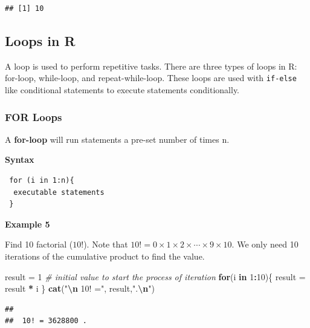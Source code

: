 \documentclass[
]{book}
\newenvironment{Shaded}{\begin{snugshade}}{\end{snugshade}}
\newcommand{\CommentTok}[1]{\textcolor[rgb]{0.56,0.35,0.01}{\textit{#1}}}
\newcommand{\ControlFlowTok}[1]{\textcolor[rgb]{0.13,0.29,0.53}{\textbf{#1}}}
\newcommand{\DecValTok}[1]{\textcolor[rgb]{0.00,0.00,0.81}{#1}}
\newcommand{\FunctionTok}[1]{\textcolor[rgb]{0.13,0.29,0.53}{\textbf{#1}}}
\newcommand{\NormalTok}[1]{#1}
\newcommand{\OtherTok}[1]{\textcolor[rgb]{0.56,0.35,0.01}{#1}}
\newcommand{\SpecialCharTok}[1]{\textcolor[rgb]{0.81,0.36,0.00}{\textbf{#1}}}
\newcommand{\StringTok}[1]{\textcolor[rgb]{0.31,0.60,0.02}{#1}}
\begin{document}
\begin{verbatim}
## [1] 10
\end{verbatim}

\hfill\break

\hypertarget{loops-in-r}{%
\subsection{Loops in R}\label{loops-in-r}}

A loop is used to perform repetitive tasks. There are three types of loops in R: for-loop, while-loop, and repeat-while-loop. These loops are used with \texttt{if-else} like conditional statements to execute statements conditionally.

\hypertarget{for-loops}{%
\subsubsection{FOR Loops}\label{for-loops}}

A \textbf{for-loop} will run statements a pre-set number of times n.

\textbf{Syntax}

\begin{verbatim}
 for (i in 1:n){
  executable statements 
 }
\end{verbatim}

\textbf{Example 5}

Find 10 factorial (\(10!\)). Note that \(10! = 0\times 1\times 2\times \cdots \times 9 \times 10\). We only need 10 iterations of the cumulative product to find the value.

\begin{Shaded}
\begin{Highlighting}[]
\NormalTok{result }\OtherTok{=} \DecValTok{1}  \CommentTok{\# initial value to start the process of iteration}
\ControlFlowTok{for}\NormalTok{(i }\ControlFlowTok{in} \DecValTok{1}\SpecialCharTok{:}\DecValTok{10}\NormalTok{)\{}
\NormalTok{  result }\OtherTok{=}\NormalTok{ result }\SpecialCharTok{*}\NormalTok{ i}
\NormalTok{\}}
\FunctionTok{cat}\NormalTok{(}\StringTok{"}\SpecialCharTok{\textbackslash{}n}\StringTok{ 10! ="}\NormalTok{, result,}\StringTok{".}\SpecialCharTok{\textbackslash{}n}\StringTok{"}\NormalTok{)}
\end{Highlighting}
\end{Shaded}

\begin{verbatim}
## 
##  10! = 3628800 .
\end{verbatim}
\end{document}
